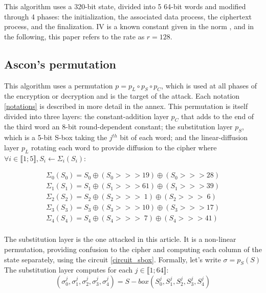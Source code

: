 \documentclass[11pt,technote]{IEEEtran}
\begin{document}
	\begin{algorithm}[h]
	\end{algorithm}
	
	This algorithm uses a 320-bit state, divided into 5 64-bit words and modified through 4 phases: the initialization, the associated data process, the ciphertext process, and the finalization. IV is a known constant given in the norm \cite{norme}, and in the following, this paper refers to the rate as $r=128$.
	
	
	\subsection{Ascon's permutation}	\label{perm}	
	This algorithm uses a permutation $p = p_L \circ p_S \circ p_C$, which is used at all phases of the encryption or decryption and is the target of the attack. Each notation \ref{notations} is described in more detail in the annex. This permutation is itself divided into three layers: the constant-addition layer $p_C$ that adds to the end of the third word an 8-bit round-dependent constant; the substitution layer $p_S$, which is a 5-bit S-box taking the $j^{th}$ bit of each word; and the linear-diffusion layer $p_L$ rotating each word to provide diffusion to the cipher where $\forall i \in \llbracket 1;5 \rrbracket, S_i \leftarrow \Sigma_i(S_i)$:
	
	\begin{gather*}
		\Sigma_0(S_0) = S_0 \oplus (S_0 >>> 19) \oplus (S_0 >>> 28)\\
		\Sigma_1(S_1) = S_1 \oplus (S_1 >>> 61) \oplus (S_1 >>> 39)\\
		\Sigma_2(S_2) = S_2 \oplus (S_2 >>> \;  1) \oplus (S_2 >>> \; 6)\\
		\Sigma_3(S_3) = S_3 \oplus (S_3 >>> 10) \oplus (S_3 >>> 17)\\
		\Sigma_4(S_4) = S_4 \oplus (S_4 >>> \; 7) \oplus (S_4 >>> 41)\\
	\end{gather*}
	
	The substitution layer is the one attacked in this article. It is a non-linear permutation, providing confusion to the cipher and computing each column of the state separately, using the circuit \ref{circuit_sbox}. Formally, let's write $\sigma=p_S(S)$\\
	The substitution layer computes for each $j \in \llbracket 1;64 \rrbracket$:
	$$(\sigma_0^j,\sigma_1^j,\sigma_2^j,\sigma_3^j,\sigma_4^j) = S-box(S_0^j,S_1^j,S_2^j,S_3^j,S_4^j)$$
	
\end{document}
